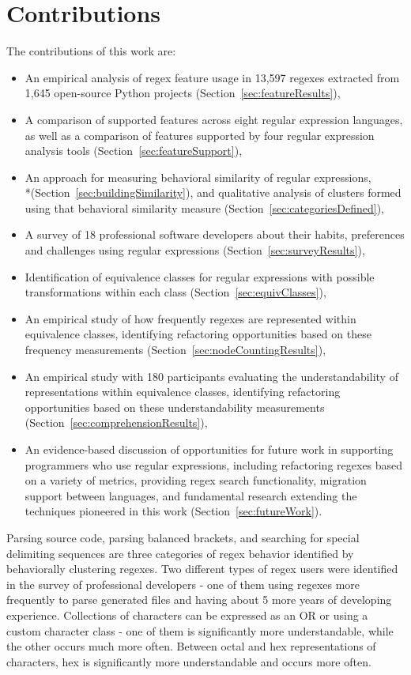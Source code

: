 \section{Contributions}

The contributions of this work are:
\begin{itemize} \setlength \itemsep{.1pt}
    \item An empirical analysis of regex feature usage in 13,597 regexes extracted from 1,645 open-source Python projects (Section~\ref{sec:featureResults}),
    \item A comparison of supported features across eight regular expression languages, as well as a comparison of features supported by four regular expression analysis tools (Section~\ref{sec:featureSupport}),
    \item An approach for measuring behavioral similarity of regular expressions, \\*(Section~\ref{sec:buildingSimilarity}), and qualitative analysis of clusters formed using that behavioral similarity measure (Section~\ref{sec:categoriesDefined}),
    \item A survey of 18 professional software developers about their habits, preferences and challenges using regular expressions (Section~\ref{sec:surveyResults}),
    \item Identification of equivalence classes for regular expressions with possible transformations within each class (Section~\ref{sec:equivClasses}),
    \item An empirical study of how frequently regexes are represented within equivalence classes, identifying refactoring opportunities based on these frequency measurements (Section~\ref{sec:nodeCountingResults}),
    \item An empirical study with 180 participants evaluating the understandability of representations within equivalence classes, identifying refactoring opportunities based on these understandability measurements (Section~\ref{sec:comprehensionResults}),
    \item An evidence-based discussion of opportunities for future work in supporting programmers who use regular expressions, including refactoring regexes based on a variety of metrics, providing regex search functionality, migration support between languages, and fundamental research extending the techniques pioneered in this work (Section~\ref{sec:futureWork}).
\end{itemize}

Parsing source code, parsing balanced brackets, and searching for special delimiting sequences are three categories of regex behavior identified by behaviorally clustering regexes.  Two different types of regex users were identified in the survey of professional developers - one of them using regexes more frequently to parse generated files and having about 5 more years of developing experience.  Collections of characters can be expressed as an OR or using a custom character class - one of them is significantly more understandable, while the other occurs much more often. Between octal and hex representations of characters, hex is significantly more understandable and occurs more often.
